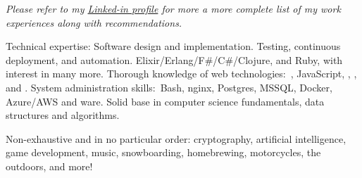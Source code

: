 \documentclass[10pt,a4paper]{article}
\begin{document}
\vspace{-0.2em}
\begin{center}
  \emph{\small Please refer to my \href{http://www.linkedin.com/in/gotbones}{Linked-in profile} for more a more complete list of my work experiences along with recommendations.}
\end{center}


\spacedhrule{-0.2em}{-0.4em}


\inlineheadsection  %
  {Technical expertise:}
  {Software design and implementation. Testing, continuous deployment, and automation. Elixir/\nsp Erlang/\nsp F\#/\nsp C\#/\nsp Clojure, and Ruby, with interest in many more. Thorough knowledge of web technologies:\ , JavaScript, , , and . System administration skills:\ Bash, nginx, Postgres, MSSQL, Docker, Azure/\nsp AWS and ware. Solid base in computer science fundamentals, data structures and algorithms.}


\inlineheadsection
  {Non-exhaustive and in no particular order:}
  {cryptography, artificial intelligence, game development, music, snowboarding, homebrewing, motorcycles, the outdoors, and more!}
\end{document}
